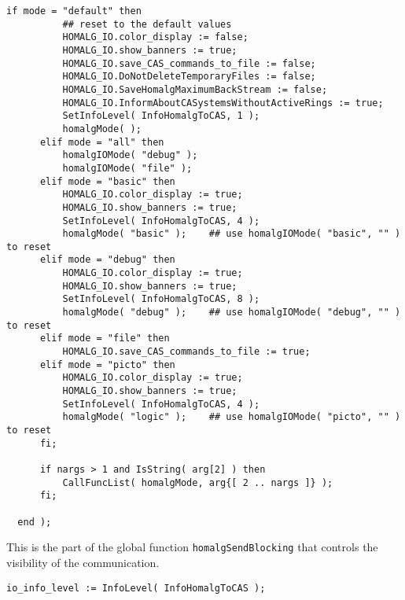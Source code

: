 \documentclass[a4paper,11pt]{report}
\begin{document}
{{{\begin{Verbatim}[fontsize=\small,frame=single,label=Code]
      if mode = "default" then
          ## reset to the default values
          HOMALG_IO.color_display := false;
          HOMALG_IO.show_banners := true;
          HOMALG_IO.save_CAS_commands_to_file := false;
          HOMALG_IO.DoNotDeleteTemporaryFiles := false;
          HOMALG_IO.SaveHomalgMaximumBackStream := false;
          HOMALG_IO.InformAboutCASystemsWithoutActiveRings := true;
          SetInfoLevel( InfoHomalgToCAS, 1 );
          homalgMode( );
      elif mode = "all" then
          homalgIOMode( "debug" );
          homalgIOMode( "file" );
      elif mode = "basic" then
          HOMALG_IO.color_display := true;
          HOMALG_IO.show_banners := true;
          SetInfoLevel( InfoHomalgToCAS, 4 );
          homalgMode( "basic" );	## use homalgIOMode( "basic", "" ) to reset
      elif mode = "debug" then
          HOMALG_IO.color_display := true;
          HOMALG_IO.show_banners := true;
          SetInfoLevel( InfoHomalgToCAS, 8 );
          homalgMode( "debug" );	## use homalgIOMode( "debug", "" ) to reset
      elif mode = "file" then
          HOMALG_IO.save_CAS_commands_to_file := true;
      elif mode = "picto" then
          HOMALG_IO.color_display := true;
          HOMALG_IO.show_banners := true;
          SetInfoLevel( InfoHomalgToCAS, 4 );
          homalgMode( "logic" );	## use homalgIOMode( "picto", "" ) to reset
      fi;
      
      if nargs > 1 and IsString( arg[2] ) then
          CallFuncList( homalgMode, arg{[ 2 .. nargs ]} );
      fi;
      
  end );
\end{Verbatim}
 

 This is the part of the global function \texttt{homalgSendBlocking} that controls the visibility of the communication. 
\begin{Verbatim}[fontsize=\small,frame=single,label=Code]
  io_info_level := InfoLevel( InfoHomalgToCAS );
  

\end{Verbatim}}}}
\end{document}
